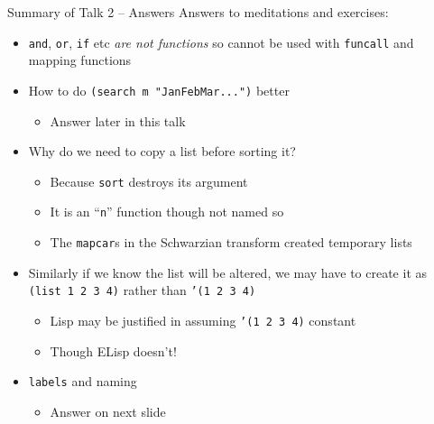\documentclass[presentation]{beamer}
\begin{document}
\begin{frame}{Summary of Talk 2 -- Answers}
  Answers to meditations and exercises:
  \begin{itemize}
  \item \texttt{and}, \texttt{or}, \texttt{if} etc \emph{are not functions} so cannot be used with \texttt{funcall} and mapping functions
  \item How to do \texttt{(search m "JanFebMar...")} better
    \begin{itemize}
    \item Answer later in this talk
    \end{itemize}
  \item Why do we need to copy a list before sorting it?
    \begin{itemize}
    \item Because \texttt{sort} destroys its argument
    \item It is an ``\texttt{n}'' function though not named so
    \item The \texttt{mapcar}s in the Schwarzian transform created temporary lists
    \end{itemize}
  \item Similarly if we know the list will be altered, we may have to create it as \texttt{(list 1 2 3 4)} rather than \texttt{'(1 2 3 4)}
    \begin{itemize}
    \item Lisp may be justified in assuming \texttt{'(1 2 3 4)} constant
    \item Though ELisp doesn't!
    \end{itemize}
  \item \texttt{labels} and naming
    \begin{itemize}
    \item Answer on next slide
    \end{itemize}

  \end{itemize}
\end{frame}
\end{document}
